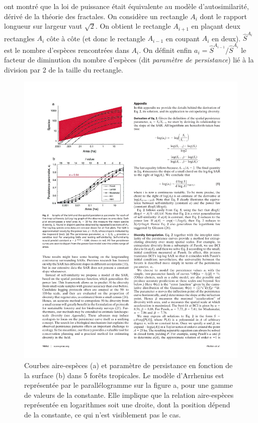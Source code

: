 \documentclass[
  11pt,
  french,
  a4paper,
  extrafontsizes,onecolumn,openright
  ]{memoir}
\newlength{\rf}
\begin{document}
\normalsize

\textcite{Harte1999} ont montré que la loi de puissance était équivalente au modèle d'autosimilarité, dérivé de la théorie des fractales.
On considère un rectangle \(A_i\) dont le rapport longueur sur largeur vaut \(\sqrt{2}\).
On obtient le rectangle \(A_{i+1}\) en plaçant deux rectangles \(A_i\) côte à côte (et donc le rectangle \(A_{i-1}\) en coupant \(A_i\) en deux).
\(\hat{S}^{A_i}\) est le nombre d'espèces rencontrées dans \(A_i\).
On définit enfin \(a_i=\hat{S}^{A_{i-1}}/\hat{S}^{A_i}\) le facteur de diminution du nombre d'espèces (dit \emph{paramètre de persistance}) lié à la division par 2 de la taille du rectangle.



\scriptsize

\begin{figure}

{\centering \includegraphics[width=0.8\linewidth]{images/Plotkin2000} 

}

\caption{Courbes aire-espèces (a) et paramètre de persistance en fonction de la surface (b) dans 5 forêts tropicales. Le modèle d'Arrhenius est représentée par le parallélogramme sur la figure a, pour une gamme de valeurs de la constante. Elle implique que la relation aire-espèces représentée en logarithmes soit une droite, dont la position dépend de la constante, ce qui n'est visiblement pas le cas.}\label{fig:Plotkin2000}
\end{figure}
\end{document}
